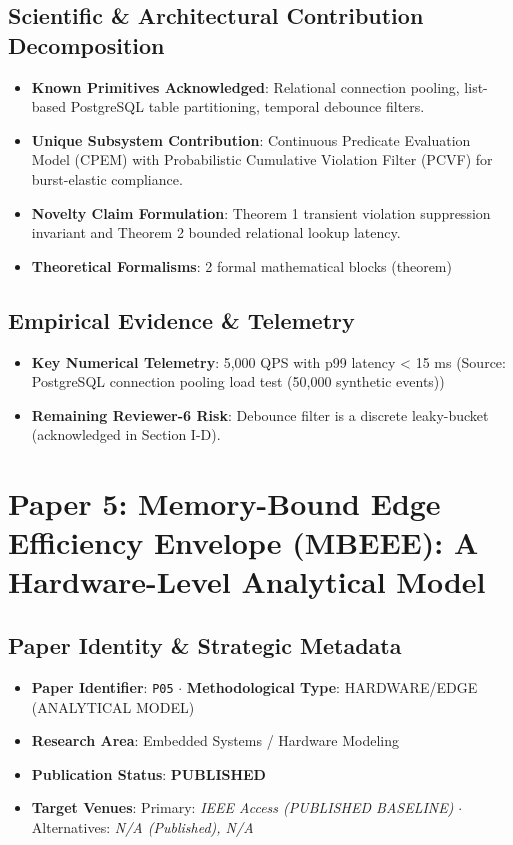 \documentclass[11pt,a4paper]{article}
\begin{document}
\subsection*{Scientific & Architectural Contribution Decomposition}
\begin{itemize}[leftmargin=1.5em, itemsep=0.2em]
    \item \textbf{Known Primitives Acknowledged}: Relational connection pooling, list-based PostgreSQL table partitioning, temporal debounce filters.
    \item \textbf{Unique Subsystem Contribution}: Continuous Predicate Evaluation Model (CPEM) with Probabilistic Cumulative Violation Filter (PCVF) for burst-elastic compliance.
    \item \textbf{Novelty Claim Formulation}: Theorem 1 transient violation suppression invariant and Theorem 2 bounded relational lookup latency.
    \item \textbf{Theoretical Formalisms}: 2 formal mathematical blocks (theorem)
\end{itemize}

\subsection*{Empirical Evidence & Telemetry}
\begin{itemize}[leftmargin=1.5em, itemsep=0.2em]
    \item \textbf{Key Numerical Telemetry}: 5,000 QPS with p99 latency < 15 ms (Source: PostgreSQL connection pooling load test (50,000 synthetic events))
    \item \textbf{Remaining Reviewer-6 Risk}: Debounce filter is a discrete leaky-bucket (acknowledged in Section I-D).
\end{itemize}

\section{Paper 5: Memory-Bound Edge Efficiency Envelope (MBEEE): A Hardware-Level Analytical Model}

\subsection*{Paper Identity \& Strategic Metadata}
\begin{itemize}[leftmargin=1.5em, itemsep=0.2em]
    \item \textbf{Paper Identifier}: \texttt{P05} $\cdot$ \textbf{Methodological Type}: HARDWARE/EDGE (ANALYTICAL MODEL)
    \item \textbf{Research Area}: Embedded Systems / Hardware Modeling
    \item \textbf{Publication Status}: \textbf{PUBLISHED}
    \item \textbf{Target Venues}: Primary: \textit{IEEE Access (PUBLISHED BASELINE)} $\cdot$ Alternatives: \textit{N/A (Published), N/A}
\end{itemize}
\end{document}
